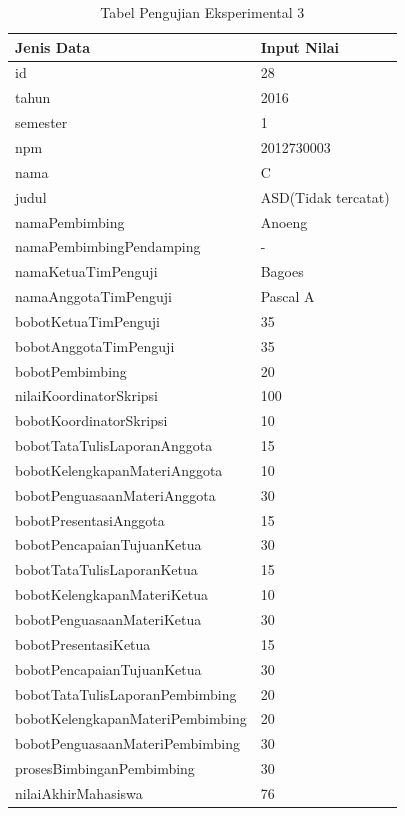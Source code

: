 	\begin{table}[H]
		\centering
		\caption{Tabel Pengujian Eksperimental 3}
		\begin{tabular}{| m{7cm} | m{5cm} |}
			\hline
			Jenis Data & Input Nilai\\
			\hline
			id & 28\\
			\hline
			tahun & 2016\\
			\hline
			semester & 1\\
			\hline
			npm & 2012730003\\
			\hline
			nama & C\\
			\hline
			judul & ASD(Tidak tercatat) \\
			\hline
			namaPembimbing & Anoeng\\
			\hline
			namaPembimbingPendamping & -\\
			\hline
			namaKetuaTimPenguji & Bagoes\\
			\hline
			namaAnggotaTimPenguji & Pascal A\\
			\hline
			bobotKetuaTimPenguji & 35\\
			\hline
			bobotAnggotaTimPenguji & 35\\
			\hline
			bobotPembimbing & 20\\
			\hline
			nilaiKoordinatorSkripsi & 100\\
			\hline
			bobotKoordinatorSkripsi & 10\\
			\hline
			bobotTataTulisLaporanAnggota & 15\\
			\hline
			bobotKelengkapanMateriAnggota & 10\\
			\hline
			bobotPenguasaanMateriAnggota & 30\\
			\hline
			bobotPresentasiAnggota & 15\\
			\hline
			bobotPencapaianTujuanKetua & 30\\
			\hline
			bobotTataTulisLaporanKetua & 15\\
			\hline
			bobotKelengkapanMateriKetua & 10\\
			\hline
			bobotPenguasaanMateriKetua & 30\\
			\hline
			bobotPresentasiKetua & 15\\
			\hline
			bobotPencapaianTujuanKetua & 30\\
			\hline
			bobotTataTulisLaporanPembimbing & 20\\
			\hline
			bobotKelengkapanMateriPembimbing &20\\
			\hline
			bobotPenguasaanMateriPembimbing & 30\\
			\hline
			prosesBimbinganPembimbing & 30\\
			\hline
			nilaiAkhirMahasiswa & 76\\
			\hline
		\end{tabular}
	\end{table}
